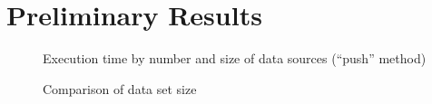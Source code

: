 \documentclass{CRPITStyle}
\begin{document}
\section{Preliminary Results}
\label{sec-results}


\begin{figure}
	\caption{Execution time by number and size of data sources (``push'' method)}
	\label{fig-run-times}
\end{figure}


\begin{figure}
	\caption{Comparison of data set size}
	\label{fig-sizes}
\end{figure}
\end{document}
